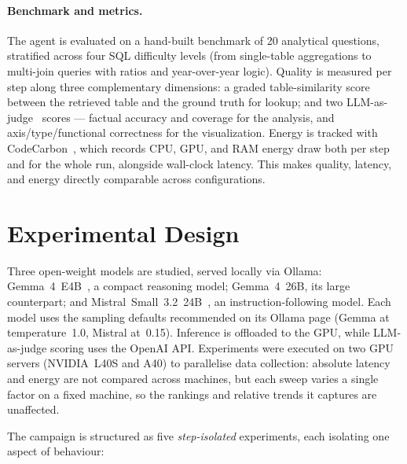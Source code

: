 \documentclass[11pt,a4paper,twocolumn]{article}
\begin{document}
\paragraph{Benchmark and metrics.}
The agent is evaluated on a hand-built benchmark of 20 analytical questions, stratified
across four SQL difficulty levels (from single-table aggregations to multi-join queries
with ratios and year-over-year logic). Quality is measured per step along three
complementary dimensions: a graded table-similarity score between the
retrieved table and the ground truth for lookup; and two LLM-as-judge~\cite{zheng2023judging}
scores --- factual accuracy and coverage for the analysis, and axis/type/functional
correctness for the visualization. Energy is tracked with CodeCarbon~\cite{lottick2019codecarbon},
which records CPU, GPU, and RAM energy draw both per step and for the whole run, alongside
wall-clock latency. This makes quality, latency, and energy directly comparable across
configurations.

\section{Experimental Design}
\label{sec:es_design}

Three open-weight models are studied, served locally via Ollama:
Gemma~4~E4B~\cite{gemma4_2025}, a compact reasoning model; Gemma~4~26B, its large
counterpart; and Mistral~Small~3.2~24B~\cite{mistralsmall_2025}, an instruction-following
model. Each model uses the sampling defaults recommended on its Ollama page (Gemma at
temperature~1.0, Mistral at~0.15). Inference is offloaded to the GPU, while
LLM-as-judge scoring uses the OpenAI API. Experiments were executed on
two GPU servers (NVIDIA~L40S and A40) to parallelise data collection: absolute latency and
energy are not compared across machines, but each sweep varies a single factor on a fixed
machine, so the rankings and relative trends it captures are unaffected.

The campaign is structured as five \emph{step-isolated} experiments, each isolating one
aspect of behaviour:
\end{document}
